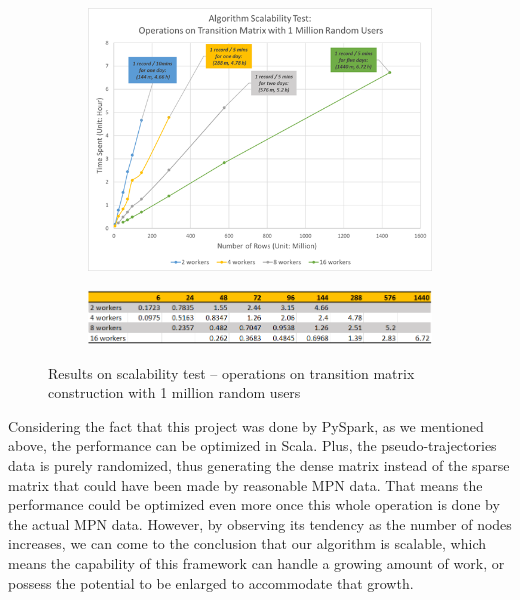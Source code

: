 \documentclass[12pt]{article}
\theoremstyle{definition}
\begin{document}
\begin{figure}
  \centering
  \begin{subfigure}[t]{0.8\textwidth}
    \includegraphics[width=\textwidth]{Scalability_test_1.jpg}
    \caption{}
  \end{subfigure}
  \begin{subfigure}[t]{0.8\textwidth}
    \includegraphics[width=\textwidth]{Scalability_test_2.png}
    \caption{}
  \end{subfigure}
  \caption{Results on scalability test -- operations on transition matrix construction with 1 million random users}
  \label{fig:scalability}
\end{figure}


Considering the fact that this project was done by PySpark, as we mentioned above, the performance can be optimized in Scala. Plus, the pseudo-trajectories data is purely randomized, thus generating the dense matrix instead of the sparse matrix that could have been made by reasonable MPN data. That means the performance could be optimized even more once this whole operation is done by the actual MPN data. However, by observing its tendency as the number of nodes increases, we can come to the conclusion that our algorithm is scalable, which means the capability of this framework can handle a growing amount of work, or possess the potential to be enlarged to accommodate that growth. \newpage
\end{document}
